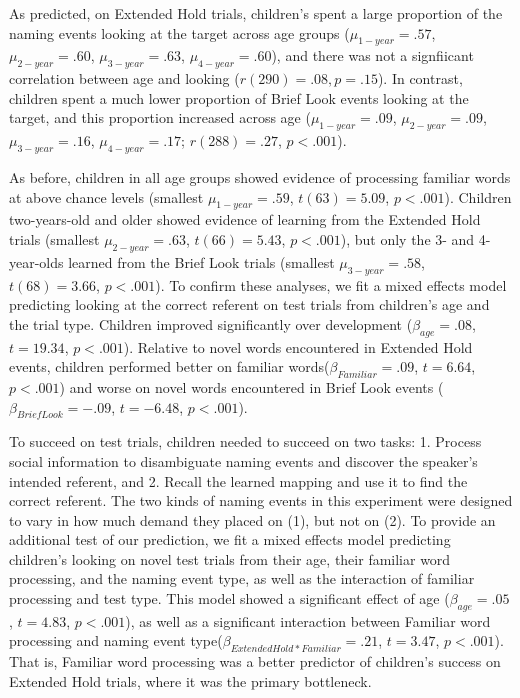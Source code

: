 \documentclass{pnastwo}
\begin{document}
\begin{article}
As predicted, on Extended Hold trials, children's spent a large proportion of the naming events looking at the target across age groups ($\mu_{1-year} = .57$, $\mu_{2-year} = .60$, $\mu_{3-year} = .63$, $\mu_{4-year} = .60$), and there was not a signfiicant correlation between age and looking ($r(290) = .08, p = .15$). In contrast, children spent a much lower proportion of Brief Look events looking at the target, and this proportion increased across age ($\mu_{1-year} = .09$, $\mu_{2-year} = .09$, $\mu_{3-year} = .16$, $\mu_{4-year} = .17$; $r(288) = .27$, $p  < .001$). 

As before, children in all age groups showed evidence of processing familiar words at above chance levels (smallest $\mu_{1-year} = .59$, $t(63) = 5.09$, $p < .001$). Children two-years-old and older showed evidence of learning from the Extended Hold trials (smallest $\mu_{2-year} = .63$, $t(66) = 5.43$, $p < .001$), but only the 3- and 4-year-olds learned from the Brief Look trials (smallest $\mu_{3-year} = .58$, $t(68) = 3.66$, $p < .001$). To confirm these analyses, we fit a mixed effects model predicting looking at the correct referent on test trials from children's age and the trial type. Children improved significantly over development ($\beta_{age} = .08$, $t = 19.34$, $p < . 001$). Relative to novel words encountered in Extended Hold events, children performed better on familiar words($\beta_{Familiar} = .09$, $t = 6.64$, $p < . 001$) and worse on novel words encountered in Brief Look events ($\beta_{Brief Look} = -.09$, $t = -6.48$, $p < . 001$).

To succeed on test trials, children needed to succeed on two tasks: 1. Process social information to disambiguate naming events and discover the speaker's intended referent, and 2. Recall the learned mapping and use it to find the correct referent. The two kinds of naming events in this experiment were designed to vary in how much demand they placed on (1), but not on (2). To provide an additional test of our prediction, we fit a mixed effects model predicting children's looking on novel test trials from their age, their familiar word processing, and the naming event type, as well as the interaction of familiar processing and test type. This model showed a significant effect of age ($\beta_{age} = .05$, $t = 4.83$, $p < . 001$), as well as a significant interaction between Familiar word processing and naming event type($\beta_{Extended Hold * Familiar} = .21$, $t = 3.47$, $p < . 001$). That is, Familiar word processing was a better predictor of children's success on Extended Hold trials, where it was the primary bottleneck. 


\end{article}
\end{document}

